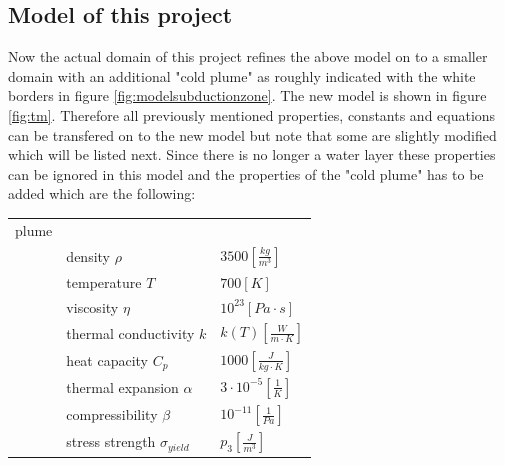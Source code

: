 \documentclass[12pt]{scrartcl}
\begin{document}
\subsection{Model of this project}
Now the actual domain of this project refines the above model on to a smaller domain with an additional "cold plume" as roughly indicated with the white borders in figure \ref{fig:modelsubductionzone}. The new model is shown in figure \ref{fig:tm}. Therefore all previously mentioned properties, constants and equations can be transfered on to the new model but note that some are slightly modified which will be listed next. Since there is no longer a water layer these properties can be ignored in this model and the properties of the "cold plume" has to be added which are the following:\\
\begin{tabular}{lll}
plume&&\\
&density $\rho$&$3500 [\frac{kg}{m^3}]$\\
&temperature $T$&$700 [K]$\\
&viscosity $\eta$&$10^{23} [Pa\cdot s]$\\
&thermal conductivity $k$&$k(T) [\frac{W}{m\cdot K}]$\\
&heat capacity $C_p$&$1000 [\frac{J}{kg\cdot K}]$\\
&thermal expansion $\alpha$&$3\cdot10^{-5}[\frac{1}{K}]$\\
&compressibility $\beta$&$10^{-11}[\frac{1}{Pa}]$\\
&stress strength $\sigma_{yield}$&$p_3 [\frac{J}{m^3}]$ \\
\end{tabular}
\end{document}
